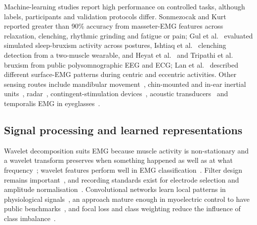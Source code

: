 \documentclass[pdflatex,sn-nature,iicol]{sn-jnl}
\begin{document}
Machine-learning studies report high performance on controlled tasks, although labels, participants and validation protocols differ. Sonmezocak and Kurt~\cite{sonmezocak2021detection,sonmezocak2021machine} reported greater than 90\% accuracy from masseter-EMG features across relaxation, clenching, rhythmic grinding and fatigue or pain; Gul et al.~\cite{gul2024advanced} evaluated simulated sleep-bruxism activity across postures, Ishtiaq et al.~\cite{ishtiaq2025wearable} clenching detection from a two-muscle wearable, and Heyat et al.~\cite{heyat2020computational} and Tripathi et al.~\cite{tripathi2024computational} bruxism from public polysomnographic EEG and ECG; Lan et al.~\cite{lan2022comparative} described different surface-EMG patterns during centric and eccentric activities. Other sensing routes include mandibular movement~\cite{martinot2021artificial}, chin-mounted and in-ear inertial units~\cite{patwa2017bruxism,schlaepfer2026new,bondareva2021earables}, radar~\cite{shen2026bruxism}, contingent-stimulation devices~\cite{haugland2020automatic}, acoustic transducers~\cite{nahhas2024wearable} and temporalis EMG in eyeglasses~\cite{zhang2018monitoring}.

\subsection{Signal processing and learned representations}

Wavelet decomposition suits EMG because muscle activity is non-stationary and a wavelet transform preserves when something happened as well as at what frequency~\cite{mallat1989theory,daubechies1992ten,englehart2003robust}; wavelet features perform well in EMG classification~\cite{phinyomark2012feature,bharathi2025unveiling}. Filter design remains important~\cite{chowdhury2013surface,deluca2010filtering,clancy2002sampling,merletti2020tutorial,boyer2023reducing}, and recording standards exist for electrode selection and amplitude normalisation~\cite{isek1999standards,hermens2000development,besomi2019consensus,besomi2020consensus,merletti2019tutorial,deluca1997use}. Convolutional networks learn local patterns in physiological signals~\cite{faust2018deep,craik2019deep,tsinganos2019improved,rim2020deep,kiranyaz20211d,ismailfawaz2019deep}, an approach mature enough in myoelectric control to have public benchmarks~\cite{atzori2014electromyography,atzori2016deep,coteallard2019deep,jiang2012myoelectric,phinyomark2018emg,wei2019multistream}, and focal loss and class weighting reduce the influence of class imbalance~\cite{lin2017focal,johnson2019survey}.
\end{document}
